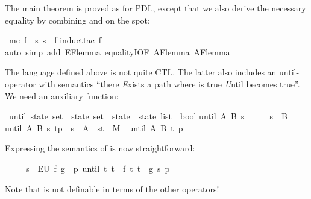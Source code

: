 \begin{isabellebody}
\begin{isamarkuptext}
The main theorem is proved as for PDL, except that we also derive the
necessary equality  by combining
 and  on the spot:%
\end{isamarkuptext}%
\isamarkuptrue%
\isamarkupfalse%
\ {\isachardoublequoteopen}mc\ f\ {\isacharequal}\ {\isacharbraceleft}s{\isachardot}\ s\ {\isasymTurnstile}\ f{\isacharbraceright}{\isachardoublequoteclose}\isanewline
%
\isadelimproof
%
\endisadelimproof
%
\isatagproof
{}\isamarkupfalse%
{\isacharparenleft}induct{\isacharunderscore}tac\ f{\isacharparenright}\isanewline
{}\isamarkupfalse%
{\isacharparenleft}auto\ simp\ add{\isacharcolon}\ EF{\isacharunderscore}lemma\ equalityI{\isacharbrackleft}OF\ AF{\isacharunderscore}lemma{}\ AF{\isacharunderscore}lemma{}{\isacharbrackright}{\isacharparenright}\isanewline
{}\isamarkupfalse%
%
\endisatagproof
{\isafoldproof}%
%
\isadelimproof
%
\endisadelimproof
%
\begin{isamarkuptext}%
The language defined above is not quite CTL\@. The latter also includes an
until-operator  with semantics ``there \emph{E}xists a path
where  is true \emph{U}ntil  becomes true''.  We need
an auxiliary function:%
\end{isamarkuptext}%
\isamarkuptrue%
\isamarkupfalse%
\ until{\isacharcolon}{\isacharcolon}\ {\isachardoublequoteopen}state\ set\ {\isasymRightarrow}\ state\ set\ {\isasymRightarrow}\ state\ {\isasymRightarrow}\ state\ list\ {\isasymRightarrow}\ bool{\isachardoublequoteclose}\isanewline
{}\isamarkupfalse%
\isanewline
{\isachardoublequoteopen}until\ A\ B\ s\ {\isacharbrackleft}{\isacharbrackright}\ \ \ \ {\isacharequal}\ {\isacharparenleft}s\ {\isasymin}\ B{\isacharparenright}{\isachardoublequoteclose}\isanewline
{\isachardoublequoteopen}until\ A\ B\ s\ {\isacharparenleft}t{\isacharhash}p{\isacharparenright}\ {\isacharequal}\ {\isacharparenleft}s\ {\isasymin}\ A\ {\isasymand}\ {\isacharparenleft}s{\isacharcomma}t{\isacharparenright}\ {\isasymin}\ M\ {\isasymand}\ until\ A\ B\ t\ p{\isacharparenright}{\isachardoublequoteclose}%
\begin{isamarkuptext}%
\noindent
Expressing the semantics of  is now straightforward:
\begin{isabelle}%
\ \ \ \ \ s\ {\isasymTurnstile}\ EU\ f\ g\ {\isacharequal}\ {\isacharparenleft}{\isasymexists}p{\isachardot}\ until\ {\isacharbraceleft}t{\isachardot}\ t\ {\isasymTurnstile}\ f{\isacharbraceright}\ {\isacharbraceleft}t{\isachardot}\ t\ {\isasymTurnstile}\ g{\isacharbraceright}\ s\ p{\isacharparenright}%
\end{isabelle}
Note that  is not definable in terms of the other operators!


\end{isamarkuptext}
\end{isabellebody}
